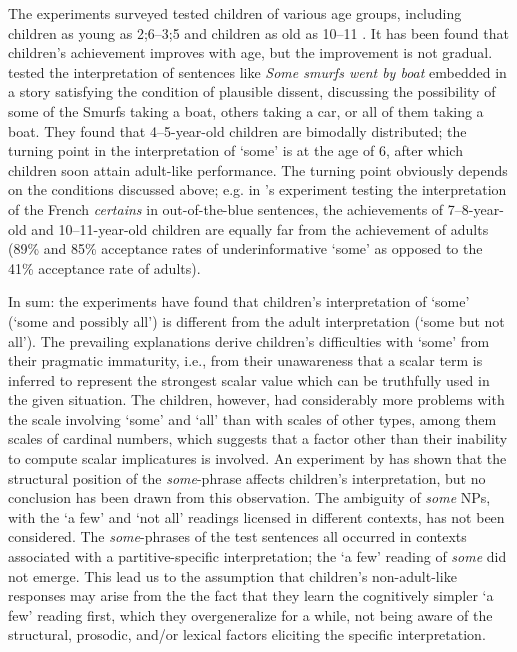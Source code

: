 \documentclass[output=paper]{langscibook}
\begin{document}
The experiments surveyed tested children of various age groups, including children as young as 2;6--3;5 \citep{huang2013exactly} and children as old as 10--11 \citep{noveck2001children}. It has been found that children's achievement improves with age, but the improvement is not gradual. \citet{foppolo2012scalar} tested the interpretation of sentences like \textit{Some smurfs went by boat} embedded in a story satisfying the condition of plausible dissent, discussing the possibility of some of the Smurfs taking a boat, others taking a car, or all of them taking a boat. They found that 4--5-year-old children are bimodally distributed; the turning point in the interpretation of `some' is at the age of 6, after which children soon attain adult-like performance. The turning point obviously depends on the conditions discussed above; e.g. in \citeauthor{noveck2001children}'s experiment testing the interpretation of the French \textit{certains} in out-of-the-blue sentences, the achievements of 7--8-year-old  and 10--11-year-old children are equally far from the achievement of adults (89\% and 85\% acceptance rates of underinformative `some'  as opposed to the 41\% acceptance rate of adults).

In sum: the experiments have found that children's interpretation of `some' (`some and possibly all') is different from the adult interpretation (`some but not all'). The prevailing explanations derive children's difficulties with `some' from their pragmatic immaturity, i.e., from their unawareness that a scalar term is inferred to represent the strongest scalar value which can be truthfully used in the given situation. The children, however, had considerably more problems with the scale involving `some' and `all' than with scales of other types, among them scales of cardinal numbers, which suggests that a factor other than their inability to compute scalar implicatures is involved. An experiment by \citet{miller2005young} has shown that the structural position of the \textit{some}-phrase affects children's interpretation, but no conclusion has been drawn from this observation. The ambiguity of \textit{some} NPs, with the `a few' and `not all' readings licensed in different contexts, has not been considered. The \textit{some}-phrases of the test sentences all occurred in contexts associated with a partitive-specific interpretation; the `a few' reading of \textit{some} did not emerge. This lead us to the assumption that children's non-adult-like responses may arise from the the fact that they learn the cognitively simpler `a few' reading first, which they overgeneralize for a while, not being aware of the structural, prosodic, and/or lexical factors eliciting the specific interpretation.
\end{document}

